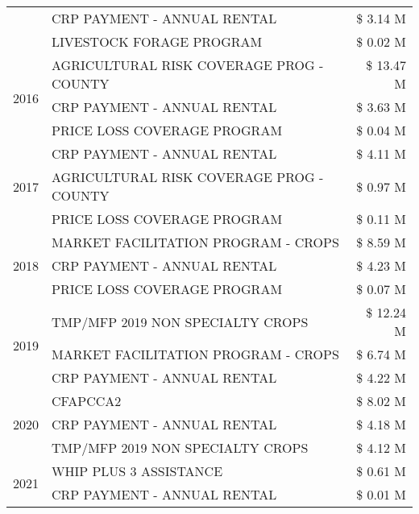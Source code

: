 \begin{tabular}{llr}
 & CRP PAYMENT - ANNUAL RENTAL & \$ 3.14 M \\
 & LIVESTOCK FORAGE PROGRAM & \$ 0.02 M \\
\cline{1-3}
\multirow[t]{3}{*}{2016} & AGRICULTURAL RISK COVERAGE PROG - COUNTY & \$ 13.47 M \\
 & CRP PAYMENT - ANNUAL RENTAL & \$ 3.63 M \\
 & PRICE LOSS COVERAGE PROGRAM & \$ 0.04 M \\
\cline{1-3}
\multirow[t]{3}{*}{2017} & CRP PAYMENT - ANNUAL RENTAL & \$ 4.11 M \\
 & AGRICULTURAL RISK COVERAGE PROG - COUNTY & \$ 0.97 M \\
 & PRICE LOSS COVERAGE PROGRAM & \$ 0.11 M \\
\cline{1-3}
\multirow[t]{3}{*}{2018} & MARKET FACILITATION PROGRAM - CROPS & \$ 8.59 M \\
 & CRP PAYMENT - ANNUAL RENTAL & \$ 4.23 M \\
 & PRICE LOSS COVERAGE PROGRAM & \$ 0.07 M \\
\cline{1-3}
\multirow[t]{3}{*}{2019} & TMP/MFP 2019 NON SPECIALTY CROPS & \$ 12.24 M \\
 & MARKET FACILITATION PROGRAM - CROPS & \$ 6.74 M \\
 & CRP PAYMENT - ANNUAL RENTAL & \$ 4.22 M \\
\cline{1-3}
\multirow[t]{3}{*}{2020} & CFAPCCA2 & \$ 8.02 M \\
 & CRP PAYMENT - ANNUAL RENTAL & \$ 4.18 M \\
 & TMP/MFP 2019 NON SPECIALTY CROPS & \$ 4.12 M \\
\cline{1-3}
\multirow[t]{2}{*}{2021} & WHIP PLUS 3 ASSISTANCE & \$ 0.61 M \\
 & CRP PAYMENT - ANNUAL RENTAL & \$ 0.01 M \\
\cline{1-3}
\bottomrule
\end{tabular}
